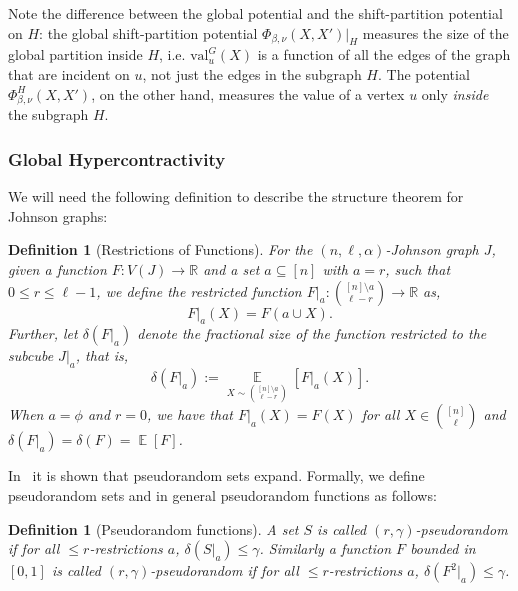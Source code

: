 \documentclass[11pt]{article}
\DeclareMathOperator*{\E}{\mathbb{E}}
\def \R {\mathbb{R}}
\def \val {\mathrm{val}}
\newcommand{\dor}[1]{}
\newtheorem{definition}[theorem]{Definition}
\theoremstyle{definition}
\begin{document}
Note the difference between the global potential and the shift-partition potential on $H$: the global shift-partition potential $\Phi_{\beta,\nu}(X,X')|_{H}$ measures the size of the global partition inside $H$, i.e. $\val_u^G(X)$ is a function of all the edges of the graph that are incident on $u$, not just the edges in the subgraph $H$. The potential 
$\Phi_{\beta,\nu}^{H}(X,X')$, on 
the other hand, measures the value of a vertex $u$ only \emph{inside} the subgraph $H$. 


\subsubsection{Global Hypercontractivity}
We will need the following definition to describe the structure theorem for Johnson graphs:
\begin{definition}[Restrictions of Functions]
For the $(n,\ell,\alpha)$-Johnson graph $J$, given a function $F:V(J) \rightarrow \R$ and a set $a \subseteq [n]$ with $a = r$, such that $0 \leq r \leq \ell-1$, we define the restricted function $F|_a: \binom{[n] \setminus a}{\ell - r} \rightarrow \R$ as, 
$$F|_a(X) = F(a \cup X).$$
Further, let $\delta(F|_a)$ denote the fractional size of the function restricted to the subcube $J|_a$, that is,
$$\delta(F|_a) := \E\limits_{X \sim \binom{[n] \setminus a}{\ell - r}}[F|_a(X)].$$
When $a = \phi$ and $r = 0$, we have that $F|_a(X) = F(X)$ for all $X \in \binom{[n]}{\ell}$ and $\delta(F|_a) = \delta(F) = \E[F]$.
\end{definition}


In~\cite{KMMS} it is shown that pseudorandom sets expand. Formally, we define pseudorandom sets and in general pseudorandom functions as follows:
\begin{definition}[Pseudorandom functions]\label{def:p.r.}
A set $S$ is called $(r,\gamma)$-pseudorandom if for all $\leq r$-restrictions $a$, $\delta(S|_a) \leq \gamma$. Similarly a function $F$ bounded in $[0,1]$ is called $(r,\gamma)$-pseudorandom if for all $\leq r$-restrictions $a$, $\delta(F^2|_a) \leq \gamma$.
\end{definition}
\end{document}
